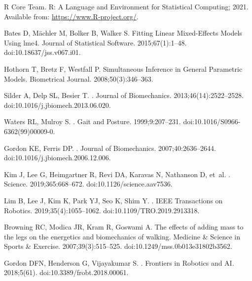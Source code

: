 \documentclass[10pt,letterpaper]{article}
\begin{document}
\begin{thebibliography}{10}
{R Core Team}. R: A Language and Environment for Statistical Computing; 2021.
\newblock Available from: \url{https://www.R-project.org/}.

Bates D, M{\"a}chler M, Bolker B, Walker S.
\newblock Fitting Linear Mixed-Effects Models Using {lme4}.
\newblock Journal of Statistical Software. 2015;67(1):1--48.
\newblock doi:{10.18637/jss.v067.i01}.

Hothorn T, Bretz F, Westfall P.
\newblock Simultaneous Inference in General Parametric Models.
\newblock Biometrical Journal. 2008;50(3):346--363.

Silder A, Delp SL, Besier T.
.
\newblock Journal of Biomechanics. 2013;46(14):2522--2528.
\newblock doi:{10.1016/j.jbiomech.2013.06.020}.

Waters RL, Mulroy S.
.
\newblock Gait and Posture. 1999;9:207--231.
\newblock doi:{10.1016/S0966-6362(99)00009-0}.

Gordon KE, Ferris DP.
.
\newblock Journal of Biomechanics. 2007;40:2636–2644.
\newblock doi:{10.1016/j.jbiomech.2006.12.006}.

Kim J, Lee G, Heimgartner R, Revi DA, Karavas N, Nathanson D, et~al.
.
\newblock Science. 2019;365:668--672.
\newblock doi:{10.1126/science.aav7536}.

Lim B, Lee J, Kim K, Park YJ, Seo K, Shim Y.
.
\newblock IEEE Transactions on Robotics. 2019;35(4):1055--1062.
\newblock doi:{10.1109/TRO.2019.2913318}.

Browning RC, Modica JR, Kram R, Goswami A.
\newblock The effects of adding mass to the legs on the energetics and
  biomechanics of walking.
\newblock Medicine \& Science in Sports \& Exercise. 2007;39(3):515--525.
\newblock doi:{10.1249/mss.0b013e31802b3562}.

Gordon DFN, Henderson G, Vijayakumar S.
.
\newblock Frontiers in Robotics and AI. 2018;5(61).
\newblock doi:{10.3389/frobt.2018.00061}.


\end{thebibliography}
\end{document}
